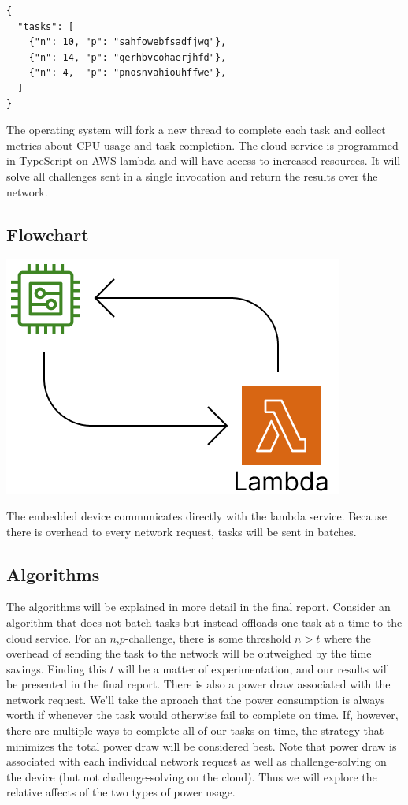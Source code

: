 \documentclass[twoside,twocolumn]{article}
\newcommand{\newp}{\newline\indent}
\begin{document}
\begin{verbatim}
{
  "tasks": [
    {"n": 10, "p": "sahfowebfsadfjwq"},
    {"n": 14, "p": "qerhbvcohaerjhfd"},
    {"n": 4,  "p": "pnosnvahiouhffwe"},
  ]
}
\end{verbatim}

The operating system will fork a new thread to complete each task and collect metrics about CPU usage and task completion.
\newp The cloud service is programmed in TypeScript on AWS lambda and will have access to increased resources.
It will solve all challenges sent in a single invocation and return the results over the network.
    
\subsection{Flowchart}

\begin{center}
  \includegraphics[scale=0.45]{flowchart.png}
\end{center}

The embedded device communicates directly with the lambda service.
Because there is overhead to every network request, tasks will be sent in batches.

\subsection{Algorithms}

The algorithms will be explained in more detail in the final report.
Consider an algorithm that does not batch tasks but instead offloads one task at a time to the cloud service.
For an $n$,$p$-challenge, there is some threshold $n>t$ where the overhead of sending the task to the network will be outweighed by the time savings.
Finding this $t$ will be a matter of experimentation, and our results will be presented in the final report.
\newp There is also a power draw associated with the network request.
We'll take the aproach that the power consumption is always worth if whenever the task would otherwise fail to complete on time.
If, however, there are multiple ways to complete all of our tasks on time, the strategy that minimizes the total power draw will be considered best.
Note that power draw is associated with each individual network request as well as challenge-solving on the device (but not challenge-solving on the cloud).
Thus we will explore the relative affects of the two types of power usage.
\end{document}
